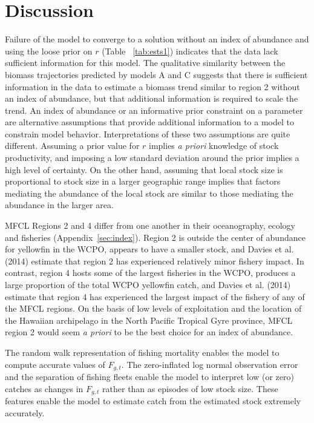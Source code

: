 \documentclass[12pt,letterpaper]{article}
\begin{document}
\section*{Discussion}
Failure of the model to converge to a solution without an index of
abundance and using the loose prior on $r$ (Table~ \ref{tab:ests1})
indicates that the data lack sufficient information for this model.
The qualitative similarity between the biomass trajectories predicted
by models A and C suggests that
there is sufficient information in the
data to estimate a biomass trend similar to region 2 without
an index of abundance, but that additional information is
required to scale the trend.
An index of abundance or an informative prior
constraint on a parameter are
alternative assumptions that provide additional information to a model
to constrain model behavior.
Interpretations of these two assumptions are quite different. 
Assuming a prior value for $r$ implies {\it a priori} knowledge of stock
productivity, and imposing a low standard deviation around the
prior implies a high level of certainty. On the other hand,
assuming that local stock size is proportional to stock size in
a larger geographic range
implies that factors mediating the abundance
of the local stock are similar to those mediating the
abundance in the larger area.

MFCL Regions 2 and 4 differ from one another in their oceanography,
ecology and fisheries (Appendix~\ref{sec:index}). 
Region 2 is outside the center of abundance for yellowfin in the
WCPO, appears to have a smaller stock, and Davies et al. (2014)
estimate that region 2 has experienced relatively minor fishery impact.
In contrast, region 4 hosts some of the largest fisheries in the WCPO,
produces a large proportion of the total WCPO yellowfin catch, and
Davies et al. (2014) estimate that region 4 has experienced
the largest impact of the fishery of any of the MFCL regions.
On the basis of low levels of exploitation and the location of the
Hawaiian archipelago in the North Pacific Tropical Gyre province, MFCL
region 2 would seem {\it a priori} to be the best choice for
an index of abundance.

The random walk representation of fishing mortality enables
the model to compute accurate values of $F_{g,t}$. The zero-inflated
log normal observation error and the separation of fishing fleets
enable the model to interpret low (or zero) catches as changes in
$F_{g,t}$ rather than as episodes of low stock size.
These features enable the model to estimate catch
from the estimated stock extremely accurately.
\end{document}
